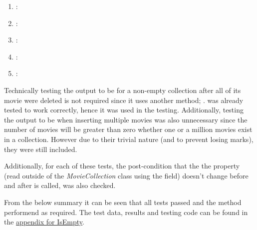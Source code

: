 \documentclass[a4paper]{article}
\begin{document}
\begin{enumerate}
   \item {}: 
   
   \item {}: 
   
   \item {}: 
   
   \item {}:
   
   \item {}: 
   
\end{enumerate}
Technically testing the output to be  for a non-empty collection after all of its movie were deleted is not required since it uses another method; .  was already tested to work correctly, hence it was used in the  testing. Additionally, testing the output to be  when inserting multiple movies was also unnecessary since the number of movies will be greater than zero whether one or a million movies exist in a collection. However due to their trivial nature (and to prevent losing marks), they were still included. 

Additionally, for each of these tests, the post-condition that the the  property (read outside of the \textit{MovieCollection} class using the  field) doesn't change before and after  is called, was also checked.
\vspace{4mm}

\noindent
From the below summary it can be seen that all tests passed and the method performend as required. The test data, results and testing code can be found in the \hyperlink{subsubsection.5.2.1}{appendix for IsEmpty}. 
\vspace{1mm}
\end{document}
